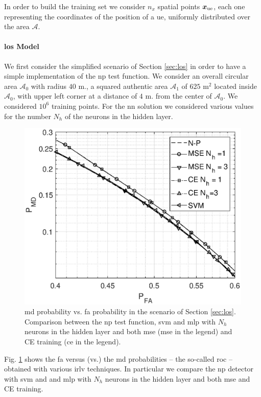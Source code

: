\documentclass[draftcls,onecolumn,12pt]{IEEEtran}
\begin{document}
In order to build the training set we consider $n_x$ spatial points $\bm{x}_{\rm ue}$, each one representing the coordinates of the position of a \ac{ue}, uniformly distributed over the area $\mathcal A$.


\paragraph*{\ac{los} Model} We first consider the simplified scenario of Section \ref{sec:los} in order to have a simple implementation of the \ac{np} test function.  We consider an overall circular area $\mathcal{A}_0$ with radius $40$ m., a squared authentic area $\mathcal{A}_1$ of $625$ m$^2$ located inside $\mathcal{A}_0$, with upper left corner at a distance of $4$ m. from the center of $\mathcal{A}_0$. We considered $10^6$ training points. For the \ac{nn} solution we considered various values for the number $N_h$ of the neurons in the hidden layer.

\begin{figure}[h]
    \centering
    \includegraphics[width=0.6\columnwidth]{res_com_CE_MSE_SVM.eps}
    \caption{\ac{md} probability vs. \ac{fa} probability in the scenario of Section \ref{sec:los}. Comparison between the \ac{np} test function, \ac{svm} and \ac{mlp} with $N_h$ neurons in the hidden layer and both \ac{mse} (\ac{mse} in the legend) and CE training (\ac{ce} in the legend).}
    \label{fig:ceVSmse}
\end{figure}

Fig. \ref{fig:ceVSmse} shows the \ac{fa} versus (vs.) the \ac{md} probabilities -- the so-called \ac{roc} --  obtained with various \ac{irlv} techniques. In particular we compare the \ac{np} detector with \ac{svm} and and \ac{mlp} with $N_h$ neurons in the hidden layer and both \ac{mse} and CE training. 
\end{document}
